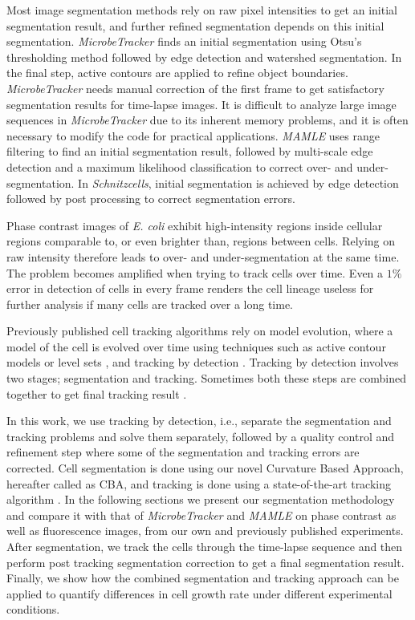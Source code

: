 \documentclass[journal]{IEEEtran}
\begin{document}
Most image segmentation methods rely on raw pixel intensities to get an initial segmentation result, and further refined segmentation depends on this initial segmentation. \textit{MicrobeTracker} finds an initial segmentation using Otsu's thresholding method \cite {otsuthreshold1979} followed by edge detection and watershed segmentation. In the final step, active contours are applied to refine object boundaries. \textit{MicrobeTracker} needs manual correction of the first frame to get satisfactory segmentation results for time-lapse images. It is difficult to analyze large image sequences in \textit{MicrobeTracker} due to its inherent memory problems, and it is often necessary to modify the code for practical applications. \textit{MAMLE} uses range filtering to find an initial segmentation result, followed by multi-scale edge detection and a maximum likelihood classification to correct over- and under- segmentation. In \textit{Schnitzcells}, initial segmentation is achieved by edge detection followed by post processing to correct segmentation errors. 

Phase contrast images of \textit{E. coli} exhibit high-intensity regions inside cellular regions comparable to, or even brighter than, regions between cells. Relying on raw intensity therefore leads to over- and under-segmentation at the same time. The problem becomes amplified when trying to track cells over time. Even a $1\%$ error in detection of cells in every frame renders the cell lineage useless for further analysis if many cells are tracked over a long time.

Previously published cell tracking algorithms rely on model evolution, where a model of the cell is evolved over time using techniques such as active contour models \cite {zimmersegmentation2002} or level sets \cite {dzyubachykadvanced2010}, and tracking by detection \cite {bisereliable2011}. Tracking by detection involves two stages; segmentation and tracking. Sometimes both these steps are combined together to get final tracking result \cite {jugoptimal2014}. 

In this work, we use tracking by detection, i.e., separate the segmentation and tracking problems and solve them separately, followed by a quality control and refinement step where some of the segmentation and tracking errors are corrected. Cell segmentation is done using our novel Curvature Based Approach, hereafter called as CBA, and tracking is done using a state-of-the-art tracking algorithm \cite {magnussonglobal2014}. In the following sections we present our segmentation methodology and compare it with that of \textit{MicrobeTracker} and \textit{MAMLE} on phase contrast as well as fluorescence images, from our own and previously published experiments. After segmentation, we track the cells through the time-lapse sequence and then perform post tracking segmentation correction to get a final segmentation result. Finally, we show how the combined segmentation and tracking approach can be applied to quantify differences in cell growth rate under different experimental conditions.
\end{document}
